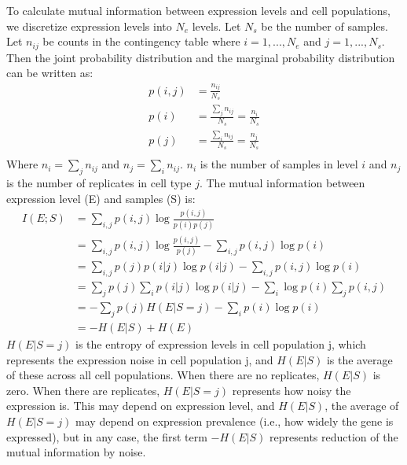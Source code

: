 To calculate mutual information between expression levels and cell populations, we discretize expression levels into $N_{e}$ levels. Let $N_{s}$ be the number of samples. Let $n_{ij}$ be counts in the contingency table where $i=1,...,N_{e}$ and $j=1,...,N_{s}$. Then the joint probability distribution and the marginal probability distribution can be written as:
\begin{align}
p(i,j) &= \frac{n_{ij}}{N_{s}} \\
p(i) &= \frac{\sum_{j}{n_{ij}}}{N_{s}} = \frac{n_i}{N_s} \\
p(j) &= \frac{\sum_{i}{n_{ij}}}{N_{s}} = \frac{n_j}{N_s}\\
\end{align}
Where $n_i = \sum_{j}{n_{ij}}$ and $n_j=\sum_{i}n_{ij}$. $n_i$ is the number of samples in level $i$ and $n_j$ is the number of replicates in cell type $j$. The mutual information between expression level (E) and samples (S) is:
\begin{align}
I(E;S) &= \sum_{i,j}{p(i,j)\log\frac{p(i,j)}{p(i)p(j)}} \\
       &= \sum_{i,j}{p(i,j)\log\frac{p(i,j)}{p(j)}}-\sum_{i,j}p(i,j)\log{p(i)}  \\
       &= \sum_{i,j}p(j)p(i|j)\log{p(i|j)}-\sum_{i,j}p(i,j)\log{p(i)}  \\
       &= \sum_{j}p(j)\sum_{i}p(i|j)\log{p(i|j)}-\sum_{i}\log{p(i)}\sum_{j}p(i,j)  \\
       &= -\sum_{j}p(j)H(E|S=j)-\sum_{i}p(i)\log{p(i)}  \\
       &= -H(E|S)+H(E)
\end{align}
$H(E|S=j)$ is the entropy of expression levels in cell population j, which represents the expression noise in cell population j, and $H(E|S)$ is the average of these across all cell populations. When there are no replicates, $H(E|S)$ is zero. When there are replicates, $H(E|S=j)$ represents how noisy the expression is. This may depend on expression level, and $H(E|S)$, the average of $H(E|S=j)$ may depend on expression prevalence (i.e., how widely the gene is expressed), but in any case, the first term $-H(E|S)$ represents reduction of the mutual information by noise. 

